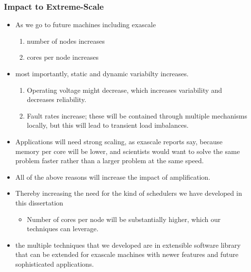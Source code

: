 \begin{frame}[label=ampProbRevisit]
\frametitle{Impact to Extreme-Scale}
\begin{itemize} 
 \small \item \small As we go to future machines including exascale
\begin{enumerate} 
 \tiny  \item \tiny  number of nodes increases 
\item \tiny cores per node increases 
\end{enumerate} 
\item most importantly, static and dynamic variabilty increases. 
\begin{enumerate}
\tiny \item \tiny Operating voltage might decrease, which increases
  variability and decreases reliability. 
\item \tiny  Fault rates increase; these will be contained
through multiple mechanisms locally, but this will lead to transient
load imbalances. 
 \end{enumerate} 
\item \small Applications will need strong scaling, as exascale reports say,
  because memory per core will be lower, and scientists would want to
  solve the same problem faster rather than a larger problem at the
  same speed. 
\item \small All of the above reasons will increase the impact of
  amplification. 
\item \small Thereby increasing the need for the kind of schedulers we have developed in
  this dissertation 
\begin{itemize} 
 \item \small Number of cores per node will be substantially higher, which our
techniques can leverage.
\end{itemize} 

\item {\small the multiple techniques that we developed are in
  extensible software library that can be extended for exascale
  machines with newer features and future sophisticated applications. }
\end{itemize} 

\end{frame} 

